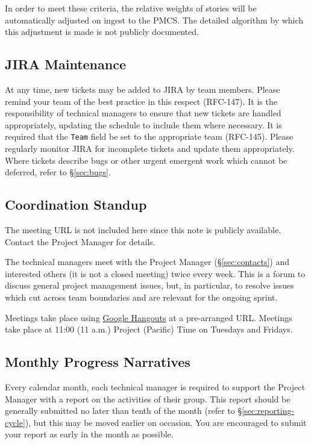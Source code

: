 In order to meet these criteria, the relative weights of stories will be
automatically adjusted on ingest to the PMCS. The detailed algorithm by
which this adjustment is made is not publicly documented.

\subsection{JIRA Maintenance}
\label{sec:jira-maintenance}

At any time, new tickets may be added to JIRA by team members. Please
remind your team of the best practice in this respect (RFC-147). It is
the responsibility of technical managers to ensure that new tickets are
handled appropriately, updating the schedule to include them where
necessary. It is required that the \texttt{Team} field be set to the
appropriate team (RFC-145). Please regularly monitor JIRA for incomplete
tickets and update them appropriately. Where tickets describe bugs or
other urgent emergent work which cannot be deferred, refer to \S\ref{sec:bugs}.

\subsection{Coordination Standup}\label{coordination-standup}

The meeting URL is not included here since this note is publicly
available. Contact the Project Manager for details.

The technical managers meet with the
Project Manager (\S\ref{sec:contacts}) and interested
others (it is not a closed meeting) twice every week. This is a forum to
discuss general project management issues, but, in particular, to
resolve issues which cut across team boundaries and are relevant for the
ongoing sprint.

Meetings take place using \href{https://hangouts.google.com/}{Google
Hangouts} at a pre-arranged URL. Meetings take place at 11:00 (11 a.m.)
Project (Pacific) Time on Tuesdays and Fridays.

\subsection{Monthly Progress Narratives}
\label{sec:monthly-narrative}

Every calendar month, each technical manager is required to support the
Project Manager with a report on the activities of their group. This
report should be generally submitted no later than tenth of the month
(refer to \S\ref{sec:reporting-cycle}), but this may be moved earlier on
occasion. You are encouraged to submit your report as early in the month
as possible.

